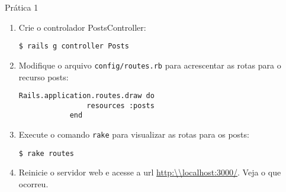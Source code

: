 \begin{frame}{Prática 1}
\begin{enumerate}
		\item Crie o controlador PostsController:
		\begin{lstlisting}[style=BashInputBasicStyle]
			$ rails g controller Posts 		
		\end{lstlisting}

		\item Modifique o arquivo \verb|config/routes.rb| para acrescentar as rotas para
		o recurso posts:
		\begin{lstlisting}[style=RubyInputStyle]
			Rails.application.routes.draw do 
				resources :posts
			end 
		\end{lstlisting}	
		
		\item Execute o comando \verb!rake! para visualizar as rotas para os
		posts:
		\begin{lstlisting}[style=BashInputBasicStyle]
			$ rake routes
		\end{lstlisting}
		
		\item Reinicie o servidor web e acesse a url \url{http:\\localhost:3000/}. Veja o que ocorreu.

	\end{enumerate}
\end{frame}